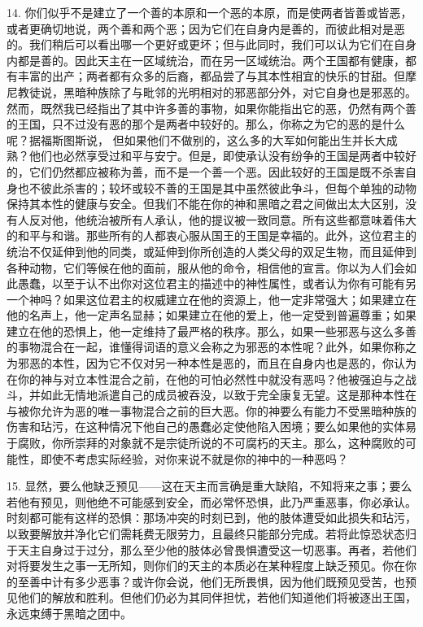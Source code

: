 14. 你们似乎不是建立了一个善的本原和一个恶的本原，而是使两者皆善或皆恶，或者更确切地说，两个善和两个恶；因为它们在自身内是善的，而彼此相对是恶的。我们稍后可以看出哪一个更好或更坏；但与此同时，我们可以认为它们在自身内都是善的。因此天主在一区域统治，而在另一区域统治。两个王国都有健康，都有丰富的出产；两者都有众多的后裔，都品尝了与其本性相宜的快乐的甘甜。但摩尼教徒说，黑暗种族除了与毗邻的光明相对的邪恶部分外，对它自身也是邪恶的。然而，既然我已经指出了其中许多善的事物，如果你能指出它的恶，仍然有两个善的王国，只不过没有恶的那个是两者中较好的。那么，你称之为它的恶的是什么呢？据福斯图斯说， 但如果他们不做别的，这么多的大军如何能出生并长大成熟？他们也必然享受过和平与安宁。但是，即使承认没有纷争的王国是两者中较好的，它们仍然都应被称为善，而不是一个善一个恶。因此较好的王国是既不杀害自身也不彼此杀害的；较坏或较不善的王国是其中虽然彼此争斗，但每个单独的动物保持其本性的健康与安全。但我们不能在你的神和黑暗之君之间做出太大区别，没有人反对他，他统治被所有人承认，他的提议被一致同意。所有这些都意味着伟大的和平与和谐。那些所有的人都衷心服从国王的王国是幸福的。此外，这位君主的统治不仅延伸到他的同类，或延伸到你所创造的人类父母的双足生物，而且延伸到各种动物，它们等候在他的面前，服从他的命令，相信他的宣言。你以为人们会如此愚蠢，以至于认不出你对这位君主的描述中的神性属性，或者认为你有可能有另一个神吗？如果这位君主的权威建立在他的资源上，他一定非常强大；如果建立在他的名声上，他一定声名显赫；如果建立在他的爱上，他一定受到普遍尊重；如果建立在他的恐惧上，他一定维持了最严格的秩序。那么，如果一些邪恶与这么多善的事物混合在一起，谁懂得词语的意义会称之为邪恶的本性呢？此外，如果你称之为邪恶的本性，因为它不仅对另一种本性是恶的，而且在自身内也是恶的，你认为在你的神与对立本性混合之前，在他的可怕必然性中就没有恶吗？他被强迫与之战斗，并如此无情地派遣自己的成员被吞没，以致于完全康复无望。这是那种本性在与被你允许为恶的唯一事物混合之前的巨大恶。你的神要么有能力不受黑暗种族的伤害和玷污，在这种情况下他自己的愚蠢必定使他陷入困境；要么如果他的实体易于腐败，你所崇拜的对象就不是宗徒所说的不可腐朽的天主。那么，这种腐败的可能性，即使不考虑实际经验，对你来说不就是你的神中的一种恶吗？\par

15. 显然，要么他缺乏预见——这在天主而言确是重大缺陷，不知将来之事；要么若他有预见，则他绝不可能感到安全，而必常怀恐惧，此乃严重恶事，你必承认。时刻都可能有这样的恐惧：那场冲突的时刻已到，他的肢体遭受如此损失和玷污，以致要解放并净化它们需耗费无限劳力，且最终只能部分完成。若将此惊恐状态归于天主自身过于过分，那么至少他的肢体必曾畏惧遭受这一切恶事。再者，若他们对将要发生之事一无所知，则你们的天主的本质必在某种程度上缺乏预见。你在你的至善中计有多少恶事？或许你会说，他们无所畏惧，因为他们既预见受苦，也预见他们的解放和胜利。但他们仍必为其同伴担忧，若他们知道他们将被逐出王国，永远束缚于黑暗之团中。\par

